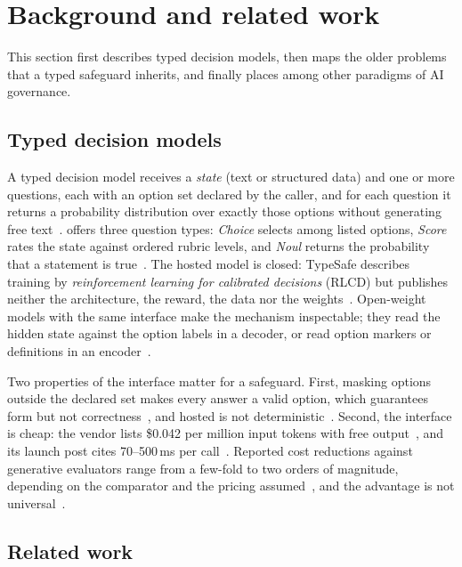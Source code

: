\section{Background and related work}
\label{sec:background}

This section first describes typed decision models, then maps the older problems that a typed safeguard inherits, and finally places \pol{} among other paradigms of AI governance.

\subsection{Typed decision models}
\label{sec:tdm}

A typed decision model receives a \emph{state} (text or structured data) and one or more questions, each with an option set declared by the caller, and for each question it returns a probability distribution over exactly those options without generating free text~\cite{arx23886,arx26758,arx32160}.
\jev{} offers three question types: \emph{Choice} selects among listed options, \emph{Score} rates the state against ordered rubric levels, and \emph{Noul} returns the probability that a statement is true~\cite{typesafe_intro,arx32160}.
The hosted model is closed: TypeSafe describes training by \emph{reinforcement learning for calibrated decisions} (RLCD) but publishes neither the architecture, the reward, the data nor the weights~\cite{almeida2026introducing,typesafe_primer}.
Open-weight models with the same interface make the mechanism inspectable; they read the hidden state against the option labels in a decoder, or read option markers or definitions in an encoder~\cite{arx23886,arx23959,arx26758}.

Two properties of the interface matter for a safeguard.
First, masking options outside the declared set makes every answer a valid option, which guarantees form but not correctness~\cite{arx26758}, and hosted \jev{} is not deterministic~\cite{arx32160,arx01006}.
Second, the interface is cheap: the vendor lists \$0.042 per million input tokens with free output~\cite{typesafe_models}, and its launch post cites 70--500\,ms per call~\cite{almeida2026introducing}.
Reported cost reductions against generative evaluators range from a few-fold to two orders of magnitude, depending on the comparator and the pricing assumed~\cite{arx29429,arx27535}, and the advantage is not universal~\cite{arx23136,arx00437}.

\subsection{Related work}
\label{sec:related}

